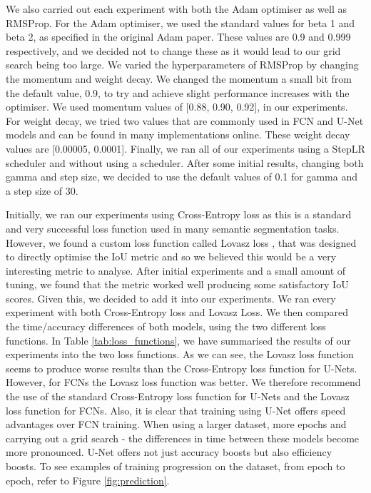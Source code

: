 \documentclass{article}
\begin{document}
We also carried out each experiment with both the Adam \cite{Kingma2014AdamAM} optimiser as well as RMSProp. For the Adam optimiser, we used the standard values for beta 1 and beta 2, as specified in the original Adam paper. These values are 0.9 and 0.999 respectively, and we decided not to change these as it would lead to our grid search being too large. We varied the hyperparameters of RMSProp by changing the momentum and weight decay. We changed the momentum a small bit from the default value, 0.9, to try and achieve slight performance increases with the optimiser. We used momentum values of [0.88, 0.90, 0.92], in our experiments. For weight decay, we tried two values that are commonly used in FCN and U-Net models and can be found in many implementations online. These weight decay values are [0.00005, 0.0001]. Finally, we ran all of our experiments using a StepLR scheduler and without using a scheduler. After some initial results, changing both gamma and step size, we decided to use the default values of 0.1 for gamma and a step size of 30.

Initially, we ran our experiments using Cross-Entropy loss as this is a standard and very successful loss function used in many semantic segmentation tasks. However, we found a custom loss function called Lovasz loss \cite{berman2018lovasz}, that was designed to directly optimise the IoU metric and so we believed this would be a very interesting metric to analyse. After initial experiments and a small amount of tuning, we found that the metric worked well producing some satisfactory IoU scores. Given this, we decided to add it into our experiments. We ran every experiment with both Cross-Entropy loss and Lovasz Loss. We then compared the time/accuracy differences of both models, using the two different loss functions. In Table \ref{tab:loss_functions}, we have summarised the results of our experiments into the two loss functions. As we can see, the Lovasz loss function seems to produce worse results than the Cross-Entropy loss function for U-Nets. However, for FCNs the Lovasz loss function was better. We therefore recommend the use of the standard Cross-Entropy loss function for U-Nets and the Lovasz loss function for FCNs. Also, it is clear that training using U-Net offers speed advantages over FCN training. When using a larger dataset, more epochs and carrying out a grid search - the differences in time between these models become more pronounced. U-Net offers not just accuracy boosts but also efficiency boosts. To see examples of training progression on the dataset, from epoch to epoch, refer to Figure \ref{fig:prediction}.
\end{document}
